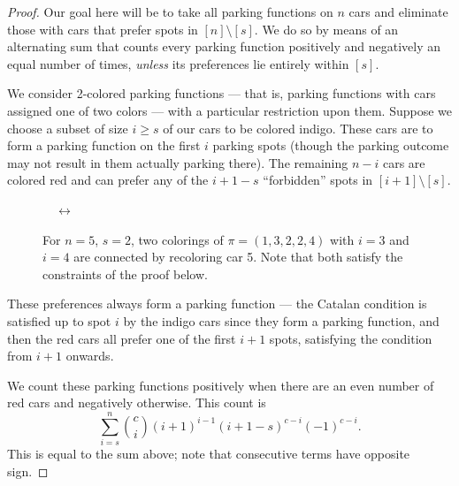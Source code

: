 \documentclass[12 pt]{amsart}
\theoremstyle{definition} %
\theoremstyle{remark} %
\newcommand{\mzncar}[3][(0,0)]{
\begin{scope}[shift={#1}]
\shade[top color=#2, bottom color=#3, shading angle=90, draw=white, rounded corners=0.7ex, very thick] (0.75,.25) -- ++(0,0.5) -- ++(0.5,0.15) -- ++(1.5,0) -- ++(0.5,0) -- ++(0,-0.65) -- (0.75,.25) -- cycle;
\draw[thick, rounded corners=0.2ex, fill=white, thick] (1.25,0.85) -- ++(0.5,0.35) -- ++(0.8,0) -- ++(0.3,-0.35) -- (1.25,0.85);
\draw[thick] (2.1,0.85) -- (2.1,1.2);
\draw[fill=gray!80,thin] (1.375,.25) circle[radius=.2];
\draw[fill=gray!80,thin] (2.76,.25) circle[radius=.2];
\end{scope}
}
\begin{document}
\begin{proof}
    Our goal here will be to take all parking functions on $n$ cars and eliminate those with cars that prefer spots in $[n] \setminus [s]$. We do so by means of an alternating sum that counts every parking function positively and negatively an equal number of times, \textit{unless} its preferences lie entirely within $[s].$

	We consider 2-colored parking functions --- that is, parking functions with cars assigned one of two colors --- with a particular restriction upon them.  Suppose we choose a subset of size $i \ge s$ of our cars to be colored indigo. These cars are to form a parking function on the first $i$ parking spots (though the parking outcome may not result in them actually parking there). The remaining $n - i$ cars are colored red and can prefer any of the $i + 1 - s$ ``forbidden'' spots in  $[i + 1] \setminus [s]$.
    
\begin{figure}
\begin{center}
 $\quad \longleftrightarrow \quad$
\end{center}
\caption{For $n=5$, $s = 2$, two colorings of $\pi = (1,3,2,2,4)$ with $i = 3$ and $i = 4$ are connected by recoloring car 5. Note that both satisfy the constraints of the proof below.}
\end{figure}
    
    These preferences always form a parking function --- the Catalan condition is satisfied up to spot $i$ by the indigo cars since they form a parking function, and then the red cars all prefer one of the first $i + 1$ spots, satisfying the condition from $i+1$ onwards.
    
    We count these parking functions positively when there are an even number of red cars and negatively otherwise. This count is
	\[
		\sum_{i = s}^{n} \binom{c}{i} (i + 1)^{i - 1} (i + 1 - s)^{c - i} (-1)^{c - i}.
	\]
	This is equal to the sum above; note that consecutive terms have opposite sign.


\end{proof}
\end{document}
